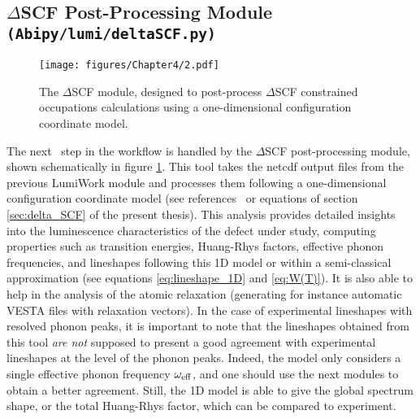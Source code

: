 \subsection*{$\Delta$SCF Post-Processing Module \texttt{(Abipy/lumi/deltaSCF.py)}}

\begin{figure}[h!]
	\centering
	\texttt{[image: figures/Chapter4/2.pdf]}
	\caption[$\Delta$SCF module]{The $\Delta$SCF module, designed to post-process $\Delta$SCF constrained occupations calculations using a one-dimensional configuration coordinate model.}
	\label{fig:Delta_SCF_post_process}
\end{figure}

The next ~step in the workflow is handled by the $\Delta$SCF post-processing module, shown schematically in figure \ref{fig:Delta_SCF_post_process}. This tool takes the netcdf output files from the previous LumiWork module and processes them following a one-dimensional configuration coordinate model (see references~\cite{jia2017first,bouquiaux2021importance} or equations of section \ref{sec:delta_SCF} of the present thesis). This analysis provides detailed insights into the luminescence characteristics of the defect under study, computing properties such as transition energies, Huang-Rhys factors, effective phonon frequencies, and lineshapes following this 1D model or within a semi-classical approximation (see equations \ref{eq:lineshape_1D} and \ref{eq:W(T)}). It is also able to help in the analysis of the atomic relaxation (generating for instance automatic VESTA \cite{momma2011vesta} files with relaxation vectors). 
In the case of experimental lineshapes with resolved phonon peaks, it is important to note that the lineshapes obtained from this tool \textit{are not} supposed to present a good agreement with experimental lineshapes at the level of the phonon peaks. Indeed, the model only considers a single effective phonon frequency $\omega_{\rm{eff}}$, and one should use the next modules to obtain a better agreement. Still, the 1D model is able to give the global spectrum shape, or the total Huang-Rhys factor, which can be compared to experiment. 

